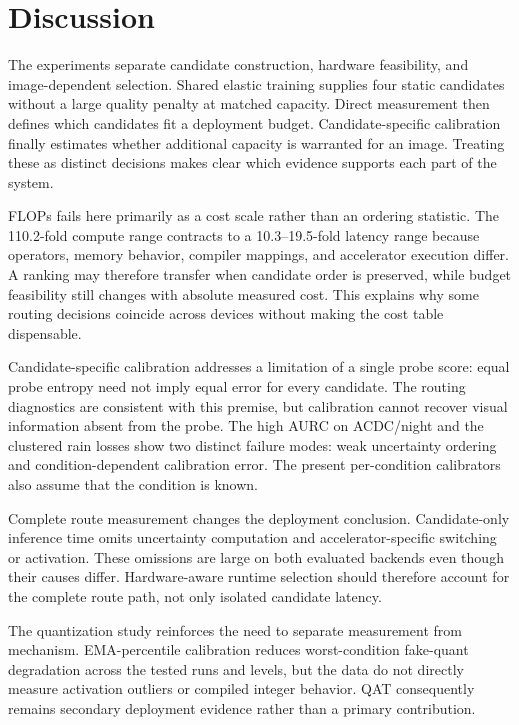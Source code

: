 \documentclass[a4paper,review,12pt]{elsarticle}
\begin{document}


\section{Discussion}
\label{sec:discussion}

The experiments separate candidate construction, hardware feasibility, and image-dependent selection. Shared elastic training supplies four static candidates without a large quality penalty at matched capacity. Direct measurement then defines which candidates fit a deployment budget. Candidate-specific calibration finally estimates whether additional capacity is warranted for an image. Treating these as distinct decisions makes clear which evidence supports each part of the system.

FLOPs fails here primarily as a cost scale rather than an ordering statistic. The 110.2-fold compute range contracts to a 10.3--19.5-fold latency range because operators, memory behavior, compiler mappings, and accelerator execution differ. A ranking may therefore transfer when candidate order is preserved, while budget feasibility still changes with absolute measured cost. This explains why some routing decisions coincide across devices without making the cost table dispensable.

Candidate-specific calibration addresses a limitation of a single probe score: equal probe entropy need not imply equal error for every candidate. The routing diagnostics are consistent with this premise, but calibration cannot recover visual information absent from the probe. The high AURC on ACDC/night and the clustered rain losses show two distinct failure modes: weak uncertainty ordering and condition-dependent calibration error. The present per-condition calibrators also assume that the condition is known.

Complete route measurement changes the deployment conclusion. Candidate-only inference time omits uncertainty computation and accelerator-specific switching or activation. These omissions are large on both evaluated backends even though their causes differ. Hardware-aware runtime selection should therefore account for the complete route path, not only isolated candidate latency.

The quantization study reinforces the need to separate measurement from mechanism. EMA-percentile calibration reduces worst-condition fake-quant degradation across the tested runs and levels, but the data do not directly measure activation outliers or compiled integer behavior. QAT consequently remains secondary deployment evidence rather than a primary contribution.
\end{document}
